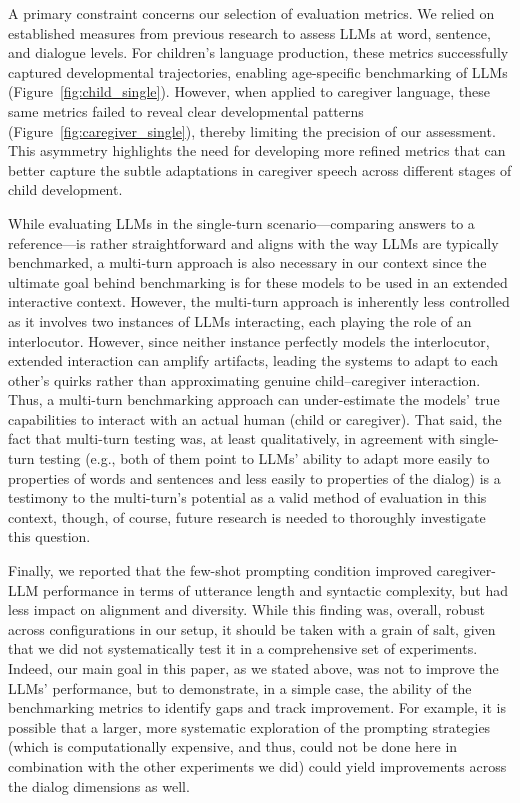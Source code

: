 A primary constraint concerns our selection of evaluation metrics. We relied on established measures from previous research to assess LLMs at word, sentence, and dialogue levels. For children's language production, these metrics successfully captured developmental trajectories, enabling age-specific benchmarking of LLMs (Figure~\ref{fig:child_single}). However, when applied to caregiver language, these same metrics failed to reveal clear developmental patterns (Figure~\ref{fig:caregiver_single}), thereby limiting the precision of our assessment. This asymmetry highlights the need for developing more refined metrics that can better capture the subtle adaptations in caregiver speech across different stages of child development.

While evaluating LLMs in the single-turn scenario---comparing answers to a reference---is rather straightforward and aligns with the way LLMs are typically benchmarked, a multi-turn approach is also necessary in our context since the ultimate goal behind benchmarking is for these models to be used in an extended interactive context. However, the multi-turn approach is inherently less controlled as it involves two instances of LLMs interacting, each playing the role of an interlocutor. However, since neither instance perfectly models the interlocutor, extended interaction can amplify artifacts, leading the systems to adapt to each other’s quirks rather than approximating genuine child–caregiver interaction. Thus, a multi-turn benchmarking approach can under-estimate the models' true capabilities to interact with an actual human (child or caregiver). That said, the fact that multi-turn testing was, at least qualitatively, in agreement with single-turn testing (e.g., both of them point to LLMs' ability to adapt more easily to properties of words and sentences and less easily to properties of the dialog) is a testimony to the multi-turn's potential as a valid method of evaluation in this context, though, of course, future research is needed to thoroughly investigate this question.

Finally, we reported that the few-shot prompting condition improved caregiver-LLM performance in terms of utterance length and syntactic complexity, but had less impact on alignment and diversity. While this finding was, overall, robust across configurations in our setup, it should be taken with a grain of salt, given that we did not systematically test it in a comprehensive set of experiments. Indeed, our main goal in this paper, as we stated above, was not to improve the LLMs' performance, but to demonstrate, in a simple case, the ability of the benchmarking metrics to identify gaps and track improvement. For example, it is possible that a larger, more systematic exploration of the prompting strategies (which is computationally expensive, and thus, could not be done here in combination with the other experiments we did) could yield improvements across the dialog dimensions as well.


